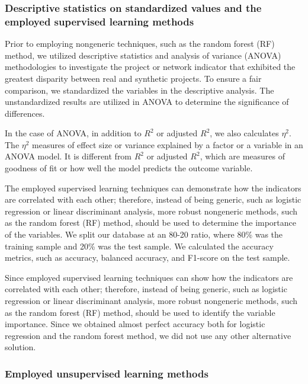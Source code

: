 \documentclass[preprint,
3p]{elsarticle} %
\begin{document}
\subsubsection{Descriptive statistics on standardized values and the
employed supervised learning methods}\label{subsubsec:supervised}

Prior to employing nongeneric techniques, such as the random forest (RF)
method, we utilized descriptive statistics and analysis of variance
(ANOVA) methodologies to investigate the project or network indicator
that exhibited the greatest disparity between real and synthetic
projects. To ensure a fair comparison, we standardized the variables in
the descriptive analysis. The unstandardized results are utilized in
ANOVA to determine the significance of differences.

In the case of ANOVA, in addition to \(R^2\) or adjusted \(R^2\), we
also calculates \(\eta^2\). The \(\eta^2\) measures of effect size or
variance explained by a factor or a variable in an ANOVA model. It is
different from \(R^2\) or adjusted \(R^2\), which are measures of
goodness of fit or how well the model predicts the outcome variable.

The employed supervised learning techniques can demonstrate how the
indicators are correlated with each other; therefore, instead of being
generic, such as logistic regression or linear discriminant analysis,
more robust nongeneric methods, such as the random forest (RF) method,
should be used to determine the importance of the variables. We split
our database at an 80-20 ratio, where 80\% was the training sample and
20\% was the test sample. We calculated the accuracy metrics, such as
accuracy, balanced accuracy, and F1-score on the test sample.

Since employed supervised learning techniques can show how the
indicators are correlated with each other; therefore, instead of being
generic, such as logistic regression or linear discriminant analysis,
more robust nongeneric methods, such as the random forest (RF) method,
should be used to identify the variable importance. Since we obtained
almost perfect accuracy both for logistic regression and the random
forest method, we did not use any other alternative solution.

\subsubsection{Employed unsupervised learning
methods}\label{subsubsec:unsupervised}
\end{document}

